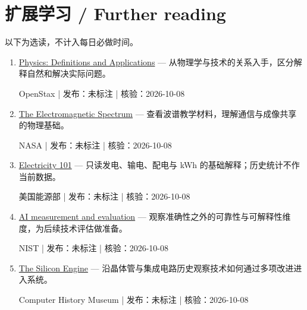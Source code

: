 \documentclass[11pt]{article}
\newcommand{\Needspace}[1]{\par\ifdim\dimexpr\pagegoal-\pagetotal\relax<#1\relax\newpage\fi}
\begin{document}
\Needspace{6\baselineskip}\section*{扩展学习 / Further reading}\small 以下为选读，不计入每日必做时间。\begin{enumerate}[leftmargin=1.6em]

\item [S1] \href{https://openstax.org/books/physics/pages/1-1-physics-definitions-and-applications}{Physics: Definitions and Applications} — 从物理学与技术的关系入手，区分解释自然和解决实际问题。\par OpenStax | 发布：未标注 | 核验：2026-10-08

\item [S2] \href{https://science.nasa.gov/ems/}{The Electromagnetic Spectrum} — 查看波谱教学材料，理解通信与成像共享的物理基础。\par NASA | 发布：未标注 | 核验：2026-10-08

\item [S3] \href{https://www.energy.gov/oe/electricity-101}{Electricity 101} — 只读发电、输电、配电与 kWh 的基础解释；历史统计不作当前数据。\par 美国能源部 | 发布：未标注 | 核验：2026-10-08

\item [S4] \href{https://www.nist.gov/ai-measurement-and-evaluation}{AI measurement and evaluation} — 观察准确性之外的可靠性与可解释性维度，为后续技术评估做准备。\par NIST | 发布：未标注 | 核验：2026-10-08

\item [S5] \href{https://www.computerhistory.org/siliconengine/}{The Silicon Engine} — 沿晶体管与集成电路历史观察技术如何通过多项改进进入系统。\par Computer History Museum | 发布：未标注 | 核验：2026-10-08

\end{enumerate}
\end{document}
